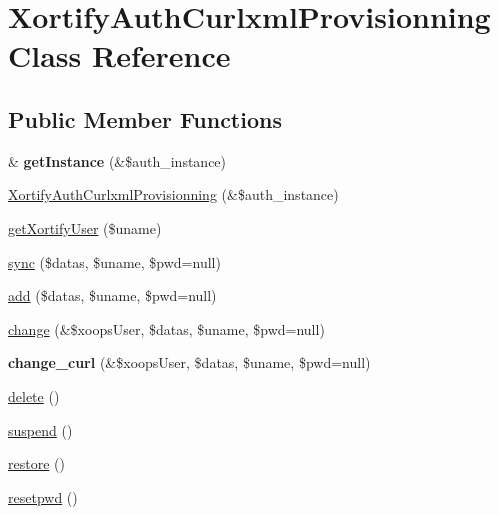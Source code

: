 \hypertarget{class_xortify_auth_curlxml_provisionning}{\section{Xortify\-Auth\-Curlxml\-Provisionning Class Reference}
\label{class_xortify_auth_curlxml_provisionning}
}
\subsection*{Public Member Functions}
\begin{DoxyCompactItemize}
\item 
\hypertarget{class_xortify_auth_curlxml_provisionning_af5ca00e0d784551640ea31056cc8cd3f}{\& {\bfseries get\-Instance} (\&\$auth\-\_\-instance)}\label{class_xortify_auth_curlxml_provisionning_af5ca00e0d784551640ea31056cc8cd3f}

\item 
\hyperlink{class_xortify_auth_curlxml_provisionning_acb54add55a86ec5a1f2c10344d0ac82e}{Xortify\-Auth\-Curlxml\-Provisionning} (\&\$auth\-\_\-instance)
\item 
\hyperlink{class_xortify_auth_curlxml_provisionning_a6507fe25028e2b3888b700a2e717fecf}{get\-Xortify\-User} (\$uname)
\item 
\hyperlink{class_xortify_auth_curlxml_provisionning_af48d255879a47ab4b17a14be9c513a10}{sync} (\$datas, \$uname, \$pwd=null)
\item 
\hyperlink{class_xortify_auth_curlxml_provisionning_a469eaf917dca248b2fc7fdfc1dafda6e}{add} (\$datas, \$uname, \$pwd=null)
\item 
\hyperlink{class_xortify_auth_curlxml_provisionning_abfdee39e0c4ac6105fc0e69c440dd382}{change} (\&\$xoops\-User, \$datas, \$uname, \$pwd=null)
\item 
\hypertarget{class_xortify_auth_curlxml_provisionning_ace19b2f4afe14dbd94dcded4b1a76143}{{\bfseries change\-\_\-curl} (\&\$xoops\-User, \$datas, \$uname, \$pwd=null)}\label{class_xortify_auth_curlxml_provisionning_ace19b2f4afe14dbd94dcded4b1a76143}

\item 
\hyperlink{class_xortify_auth_curlxml_provisionning_ad1ef91139514d20934e732c54a9c4df9}{delete} ()
\item 
\hyperlink{class_xortify_auth_curlxml_provisionning_a535fa77025643b3a367f8dfaaae3dd80}{suspend} ()
\item 
\hyperlink{class_xortify_auth_curlxml_provisionning_a632a5c6adc4efbd669eb51ee162f237a}{restore} ()
\item 
\hyperlink{class_xortify_auth_curlxml_provisionning_aafc2858f080747eccb9e27f3d7eba115}{resetpwd} ()
\end{DoxyCompactItemize}
